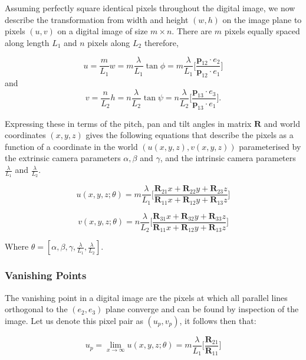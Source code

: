 \documentclass[12pt]{article}
\newcommand{\mtx}[1]{\ensuremath{\mathbf{#1}}}
\begin{document}
Assuming perfectly square identical pixels throughout the digital image, we now describe the transformation from width and height $(w,h)$ on the image plane to pixels $(u,v)$ on a digital image of size $m\times n$. There are $m$ pixels equally spaced along length $L_1$ and $n$ pixels along $L_2$ therefore,

$$
u = \frac{m}{L_1}w = m\frac{\lambda}{L_1}\tan\phi
 = m\frac{\lambda}{L_1} 
\bigg[ \frac{\textbf{p}_{12}\cdot e_2}{\textbf{p}_{12}\cdot e_1}\bigg]
$$
and
$$
v = \frac{n}{L_2}h=n\frac{\lambda}{L_2}{\tan\psi}
 = n\frac{\lambda}{L_2}
\bigg[\frac{\textbf{p}_{13}\cdot e_3}{\textbf{p}_{13}\cdot e_1}\bigg].
$$

Expressing these in terms of the pitch, pan and tilt angles in matrix $\mtx{R}$ and world coordinates $(x,y,z)$ gives the following equations that describe the pixels as a function of a coordinate in the world $(u(x,y,z),v(x,y,z))$ parameterised by the extrinsic camera parameters $\alpha, \beta$ and $\gamma$, and the intrinsic camera parameters $\frac{\lambda}{L_1}$ and $\frac{\lambda}{L_2}$.

\begin{equation}\label{u}
u(x,y,z;\theta) = m\frac{\lambda}{L_1}
\bigg[ \frac{\mtx{R}_{21}x+ \mtx{R}_{22}y + \mtx{R}_{23}z}
{\mtx{R}_{11}x+ \mtx{R}_{12}y + \mtx{R}_{13}z} \bigg]
\end{equation}

\begin{equation}\label{v}
v(x,y,z;\theta)= n\frac{\lambda}{L_2}
\bigg[ \frac{\mtx{R}_{31}x+ \mtx{R}_{32}y + \mtx{R}_{33}z}
{\mtx{R}_{11}x+ \mtx{R}_{12}y + \mtx{R}_{13}z} \bigg]
\end{equation}

Where $\theta=[\alpha,\beta,\gamma,\frac{\lambda}{L_1},\frac{\lambda}{L_2}]$.


\subsubsection{Vanishing Points}

The vanishing point in a digital image are the pixels at which all parallel lines orthogonal to the  $(e_2,e_3)$ plane converge and can be found by inspection of the image. Let us denote this pixel pair as $(u_p, v_p)$, it follows then that:

\begin{equation}\label{up}
u_p = \lim_{x\to\infty} u(x,y,z;\theta) = m\frac{\lambda}{L_1}
\bigg[\frac{\mtx{R}_{21}}
{\mtx{R}_{11}} \bigg]
\end{equation}
\end{document}
